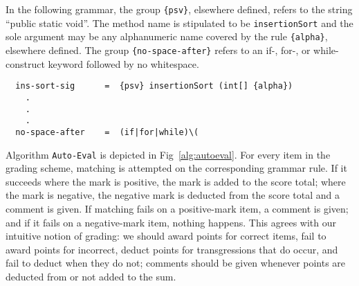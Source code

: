 In the following grammar, the group \texttt{\{psv\}}, elsewhere defined, refers
to the string ``public static void''. The method name is stipulated to be
\texttt{insertionSort} and the sole argument may be any alphanumeric name
covered by the rule \texttt{\{alpha\}}, elsewhere defined. The group
\texttt{\{no-space-after\}} refers to an if-, for-, or while- construct keyword
followed by no whitespace. 

\vspace{4pt}
\scriptsize
  \begin{Verbatim}
  ins-sort-sig      =  {psv} insertionSort (int[] {alpha})
    .
    .
    .
  no-space-after    =  (if|for|while)\(
\end{Verbatim}
\normalsize
\vspace{4pt}

Algorithm \texttt{Auto-Eval} is depicted in Fig~\ref{alg:autoeval}.  For every
item in the grading scheme, matching is attempted on the corresponding grammar
rule.  If it succeeds where the mark is positive, the mark is added to the
score total; where the mark is negative, the negative mark is deducted from the
score total and a comment is given.  If matching fails on a positive-mark item,
a comment is given; and if it fails on a negative-mark item, nothing happens.
This agrees with our intuitive notion of grading: we should award points for
correct items, fail to award points for incorrect, deduct points for
transgressions that do occur, and fail to deduct when they do not; comments
should be given whenever points are deducted from or not added to the sum.


